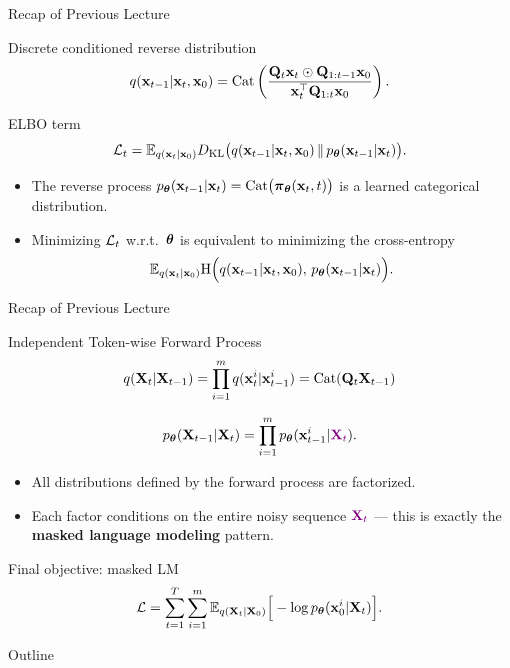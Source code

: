 \documentclass{beamer}
\begin{document}
\begin{frame}{Recap of Previous Lecture}
	\begin{block}{Discrete conditioned reverse distribution}
		\[
			q(\mathbf{x}_{t-1} | \mathbf{x}_t, \mathbf{x}_0)
			= \operatorname{Cat}\left(\frac{\mathbf{Q}_t \mathbf{x}_t \odot \mathbf{Q}_{1:t-1} \mathbf{x}_0}{\mathbf{x}_t^{\top}\mathbf{Q}_{1:t}\mathbf{x}_0}\right).
		\]
		\vspace{-0.3cm}
	\end{block}
	\begin{block}{ELBO term}
		\vspace{-0.3cm}
		\[
			\mathcal{L}_t
			= \mathbb{E}_{q(\mathbf{x}_t | \mathbf{x}_0)}
			D_\mathrm{KL}\bigl(q(\mathbf{x}_{t-1} | \mathbf{x}_t, \mathbf{x}_0) \,\|\, p_{\boldsymbol{\theta}}(\mathbf{x}_{t-1} | \mathbf{x}_t)\bigr).
		\]
		\vspace{-0.3cm}
	\end{block}
	\begin{itemize}
		\item The reverse process $p_{\boldsymbol{\theta}}(\mathbf{x}_{t-1} | \mathbf{x}_t) = \operatorname{Cat}\bigl( \boldsymbol{\pi}_{\boldsymbol{\theta}}(\mathbf{x}_t, t) \bigr)$ is a learned categorical distribution.
		\item Minimizing $\mathcal{L}_t$ w.r.t.~$\boldsymbol{\theta}$ is equivalent to minimizing the cross-entropy
		\[
			\mathbb{E}_{q(\mathbf{x}_t | \mathbf{x}_0)}
			\mathrm{H}\Bigl(q(\mathbf{x}_{t-1} | \mathbf{x}_t, \mathbf{x}_0),\, p_{\boldsymbol{\theta}}(\mathbf{x}_{t-1} | \mathbf{x}_t)\Bigr).
		\]
	\end{itemize}
\end{frame}
\begin{frame}{Recap of Previous Lecture}
	\begin{block}{Independent Token-wise Forward Process}
		\vspace{-0.3cm}
		\[
			q(\mathbf{X}_t |\mathbf{X}_{t-1}) =
			\prod_{i=1}^m q(\mathbf{x}_t^i |\mathbf{x}_{t-1}^i) = \operatorname{Cat}(\mathbf{Q}_t \mathbf{X}_{t-1})
		\]
		\vspace{-0.3cm}
	\end{block}
	\[
		p_{\boldsymbol{\theta}}(\mathbf{X}_{t-1}|\mathbf{X}_t) =
		\prod_{i=1}^m p_{\boldsymbol{\theta}}(\mathbf{x}_{t-1}^i | {\color{violet}\mathbf{X}_t}).
	\]
	\vspace{-0.3cm}
	\begin{itemize}
		\item All distributions defined by the forward process are factorized.
		\item Each factor conditions on the entire noisy sequence ${\color{violet}\mathbf{X}_t}$ --- this is exactly the \textbf{masked language modeling} pattern.
	\end{itemize}
	\begin{block}{Final objective: masked LM}
		\vspace{-0.3cm}
		\[
			\mathcal{L} =
			\sum_{t=1}^T \sum_{i=1}^m
			\mathbb{E}_{q(\mathbf{X}_t|\mathbf{X}_0)}
			\Big[-\log p_{\boldsymbol{\theta}}(\mathbf{x}_0^i |\mathbf{X}_t)\Big].
		\]
	\end{block}
\end{frame}
\begin{frame}{Outline}
	\tableofcontents
\end{frame}
\end{document}
